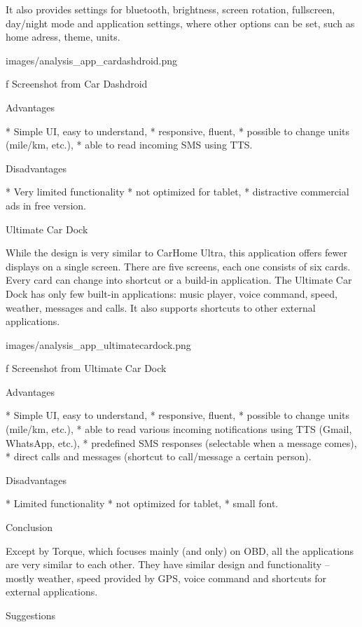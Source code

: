 It also provides settings for bluetooth, brightness, screen rotation, fullscreen, day/night mode and application settings, where other options can be set, such as home adress, theme, units.

\medskip
\centerline{\inspic images/analysis_app_cardashdroid.png }\nobreak\medskip
\caption/f Screenshot from Car Dashdroid

\seccc Advantages

\begitems
* Simple UI, easy to understand,
* responsive, fluent,
* possible to change units (mile/km, etc.),
* able to read incoming SMS using TTS.
\enditems

\seccc Disadvantages

\begitems
* Very limited functionality
* not optimized for tablet,
* distractive commercial ads in free version.
\enditems

\secc Ultimate Car Dock

While the design is very similar to CarHome Ultra, this application offers fewer displays on a single screen. There are five screens, each one consists of six cards. Every card can change into shortcut or a build-in application. The Ultimate Car Dock has only few built-in applications: music player, voice command, speed, weather, messages and calls. It also supports shortcuts to other external applications.

\medskip
\centerline{\inspic images/analysis_app_ultimatecardock.png }\nobreak\medskip
\caption/f Screenshot from Ultimate Car Dock

\seccc Advantages

\begitems
* Simple UI, easy to understand,
* responsive, fluent,
* possible to change units (mile/km, etc.),
* able to read various incoming notifications using TTS (Gmail, WhatsApp, etc.),
* predefined SMS responses (selectable when a message comes),
* direct calls and messages (shortcut to call/message a certain person).
\enditems

\seccc Disadvantages

\begitems
* Limited functionality
* not optimized for tablet,
* small font.
\enditems

\secc Conclusion

Except by Torque, which focuses mainly (and only) on OBD, all the applications are very similar to each other. They have similar design and functionality -- mostly weather, speed provided by GPS, voice command and shortcuts for external applications.

\seccc Suggestions

